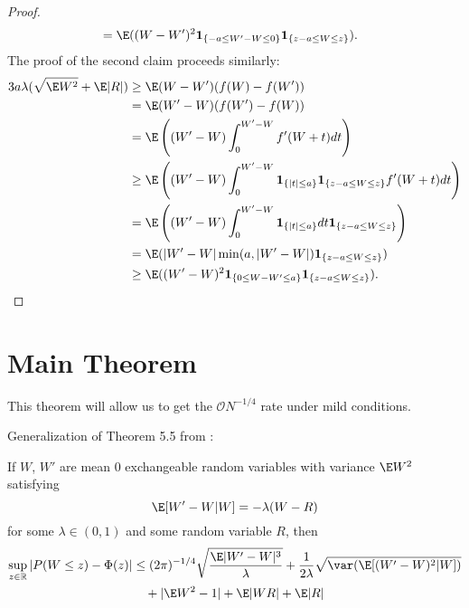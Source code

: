 \begin{proof}
\begin{align*}
    &= \E((W-W')^2 \mathbf{1}_{\{-a \leq W' - W \leq 0\}} \mathbf{1}_{\{z - a \leq W \leq z\}}).
  \end{align*}
  The proof of the second claim proceeds similarly:
    \begin{align*}
      3a \lambda (\sqrt{\E W^2} + \E |R|) &\geq \E (W-W')(f(W)-f(W')) \\
      &= \E (W'-W)(f(W')-f(W)) \\
      &= \E \left ( (W'-W) \int_{0}^{W'-W} f'(W+t)dt \right ) \\
      &\geq \E \left( (W'-W) \int_{0}^{W'-W} \mathbf{1}_{\{|t| \leq a\}}
      \mathbf{1}_{\{z - a \leq W \leq z\}} f'(W + t) dt \right ) \\
      &= \E \left( (W'-W) \int_{0}^{W'-W} \mathbf{1}_{\{|t| \leq a\}} dt
      \mathbf{1}_{\{z - a \leq W \leq z\}} \right ) \\
      &= \E(|W'-W| \min (a, |W'-W|) \mathbf{1}_{\{z - a \leq W \leq z\}}) \\
      &\geq \E((W'-W)^2 \mathbf{1}_{\{0 \leq W - W' \leq a\}} \mathbf{1}_{\{z - a \leq W \leq z\}}).
  \end{align*}
\end{proof}

\section{Main Theorem}
This theorem will allow us to get the $\mathcal{O}N^{-1/4}$ rate under
mild conditions.

Generalization of Theorem 5.5 from \cite{chen2010normal}:
\begin{theorem}
  \label{T:main}
  If $W$, $W'$ are mean 0 exchangeable random variables with variance
  $\E W^2$
  satisfying
  \begin{equation*}
    \label{eq:13}
    \E[W'-W|W] = -\lambda(W-R)
  \end{equation*}
  for some $\lambda \in (0,1)$ and some random variable $R$, then
  \begin{equation*}
    \begin{split}
      \sup_{z \in \mathbb{R}} |P(W \leq z) - \Phi(z)|
      &\leq (2\pi)^{-1/4} \sqrt{\frac{\E |W'-W|^3}{\lambda}}
      + \frac{1}{2\lambda} \sqrt{\var (\E [(W'-W)^2|W])} \\
      &\quad + |\E W^2 - 1| + \E |WR| + \E |R|
    \end{split}
  \end{equation*}
\end{theorem}

